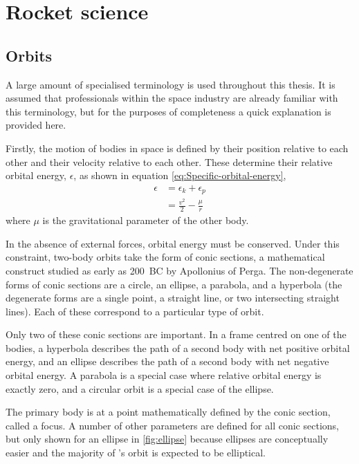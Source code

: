 \chapter{Rocket science}

\section{Orbits} \label{sec:Orbits}

A large amount of specialised terminology is used throughout this thesis. It is assumed that professionals within the space industry are already familiar with this terminology, but for the purposes of completeness a quick explanation is provided here. 

Firstly, the motion of bodies in space is defined by their position relative to each other and their velocity relative to each other. These determine their relative orbital energy, $\epsilon$, as shown in equation \eqref{eq:Specific-orbital-energy}, %
\begin{subequations} \label{eq:Specific-orbital-energy}
\begin{align} 
\epsilon &= \epsilon_k + \epsilon_p \\
&= \frac{v^2}{2} - \frac{\mu}{r}
\end{align}
\end{subequations}
where $\mu$ is the gravitational parameter of the other body.

In the absence of external forces, orbital energy must be conserved. Under this constraint, two-body orbits take the form of conic sections, a mathematical construct studied as early as 200~BC by Apollonius of Perga. The non-degenerate forms of conic sections are a circle, an ellipse, a parabola, and a hyperbola (the degenerate forms are a single point, a straight line, or two intersecting straight lines). Each of these correspond to a particular type of orbit. 

Only two of these conic sections are important. In a frame centred on one of the bodies, a hyperbola describes the path of a second body with net positive orbital energy, and an ellipse describes the path of a second body with net negative orbital energy. A parabola is a special case where relative orbital energy is exactly zero, and a circular orbit is a special case of the ellipse. 

The primary body is at a point mathematically defined by the conic section, called a focus. A number of other parameters are defined for all conic sections, but only shown for an ellipse in \autoref{fig:ellipse} because ellipses are conceptually easier and the majority of \BW's orbit is expected to be elliptical.

